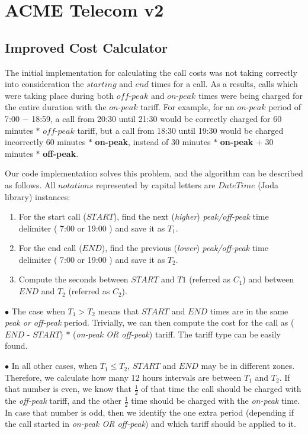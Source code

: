\documentclass[11pt,twocolumn]{article} %
\begin{document}
\section{ACME Telecom v2}

\subsection{Improved Cost Calculator}

The initial implementation for calculating the call costs was not taking correctly into consideration 
the $starting$ and $end$ times for a call. As a results, calls which were taking place during both $off$-$peak$ and 
$on$-$peak$ times were being charged for the entire duration with the $on$-$peak$ tariff. For example, for an $on$-$peak$
period of 7:00 $-$ 18:59, a call from 20:30 until 21:30 would be correctly charged for 60 minutes $\ast$
$off$-$peak$ tariff, but a call from  18:30 until 19:30 would be charged incorrectly 60 minutes $\ast$ \textbf{on-peak},
instead of 30 minutes $\ast$ \textbf{on-peak} $+$ 30 minutes $\ast$ \textbf{off-peak}.

Our code implementation solves this problem, and the algorithm can be described as follows. All $notations$ represented by capital letters 
are $DateTime$ (Joda library) instances:
\begin{enumerate}
\item{For the start call ($START$), find the next (\textit{higher}) \textit{peak/off-peak} time delimiter 
( 7:00 or 19:00 ) and save it as $T_1$.}

\item{For the end call ($END$), find the previous (\textit{lower}) \textit{peak/off-peak} time delimiter 
( 7:00 or 19:00 ) and save it as $T_2$.}

\item{Compute the seconds between $START$ and $T1$ (referred as $C_1$) and between $END$ and $T_2$ (referred as $C_2$).}


\end{enumerate}

$\bullet$ The case when $T_1 > T_2$ means that $START$ and $END$ times are in the same \textit{peak or off-peak} period. 
Trivially, we can then compute the cost for the call as ($END$ - $START$) $\ast$ (\textit{on-peak OR off-peak}) tariff. 
The tariff type can be easily found. 

$\bullet$ In all other cases, when $T_1 \leq T_2$, $START$ and $END$ may be in different zones. Therefore, we 
calculate how many 12 hours intervals are between $T_1$ and $T_2$. If that number is even,  we know that $\frac{1}{2}$ of that 
time the call should be charged with the \textit{off-peak} tariff, and the other $\frac{1}{2}$ time should be charged with the 
\textit{on-peak} time. In case that number is odd, then we identify the one extra period (depending if the call started in 
\textit{on-peak OR off-peak}) and which tariff should be applied to it.
\end{document}
